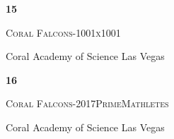 \documentclass[extrafontsizes,30pt]{memoir}
\begin{document}
\begin{center}
\mbox{}
\vspace{1in}

{\Huge \textbf{ \TeamID}}

\vspace{1in}

{\Large \textsc{\TeamName}}

\vspace{1in}

{\large \SchoolName}
\end{center}

\newpage



\renewcommand{\TeamID}{15}
\renewcommand{\TeamName}{Coral Falcons-1001x1001}
\renewcommand{\SchoolName}{Coral Academy of Science Las Vegas}

\begin{center}
\mbox{}
\vspace{1in}

{\Huge \textbf{ \TeamID}}

\vspace{1in}

{\Large \textsc{\TeamName}}

\vspace{1in}

{\large \SchoolName}
\end{center}

\newpage



\renewcommand{\TeamID}{16}
\renewcommand{\TeamName}{Coral Falcons-2017PrimeMathletes }
\renewcommand{\SchoolName}{Coral Academy of Science Las Vegas}

\begin{center}
\mbox{}
\vspace{1in}

{\Huge \textbf{ \TeamID}}

\vspace{1in}

{\Large \textsc{\TeamName}}

\vspace{1in}

{\large \SchoolName}
\end{center}

\newpage



\renewcommand{\TeamID}{17}
\renewcommand{\TeamName}{Coral Falcons-7x11x13}
\renewcommand{\SchoolName}{Coral Academy of Science Las Vegas}
\end{document}
